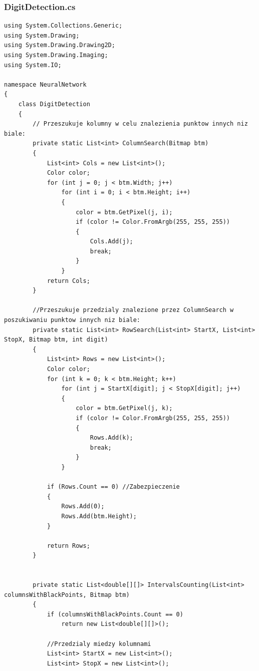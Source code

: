 \documentclass[12pt,a4paper]{article}
\begin{document}
	\vspace{20pt}	
	\subsubsection*{DigitDetection.cs}
	\begin{lstlisting}
using System.Collections.Generic;
using System.Drawing;
using System.Drawing.Drawing2D;
using System.Drawing.Imaging;
using System.IO;

namespace NeuralNetwork
{
    class DigitDetection
    {
        // Przeszukuje kolumny w celu znalezienia punktow innych niz biale:
        private static List<int> ColumnSearch(Bitmap btm)
        {
            List<int> Cols = new List<int>();
            Color color;
            for (int j = 0; j < btm.Width; j++)
                for (int i = 0; i < btm.Height; i++)
                {
                    color = btm.GetPixel(j, i);
                    if (color != Color.FromArgb(255, 255, 255))
                    {
                        Cols.Add(j);
                        break;
                    }
                }
            return Cols;
        }

        //Przeszukuje przedzialy znalezione przez ColumnSearch w poszukiwaniu punktow innych niz biale:
        private static List<int> RowSearch(List<int> StartX, List<int> StopX, Bitmap btm, int digit)
        {
            List<int> Rows = new List<int>();
            Color color;
            for (int k = 0; k < btm.Height; k++)
                for (int j = StartX[digit]; j < StopX[digit]; j++)
                {
                    color = btm.GetPixel(j, k);
                    if (color != Color.FromArgb(255, 255, 255))
                    {
                        Rows.Add(k);
                        break;
                    }
                }
            
            if (Rows.Count == 0) //Zabezpieczenie
            {
                Rows.Add(0);
                Rows.Add(btm.Height);
            }

            return Rows;
        }


        private static List<double[][]> IntervalsCounting(List<int> columnsWithBlackPoints, Bitmap btm)
        {
            if (columnsWithBlackPoints.Count == 0)
                return new List<double[][]>();

            //Przedzialy miedzy kolumnami
            List<int> StartX = new List<int>();
            List<int> StopX = new List<int>();


\end{lstlisting}
\end{document}
